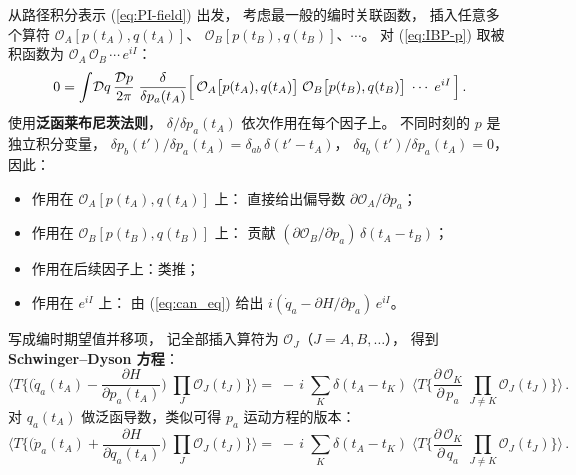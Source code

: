 \medskip\noindent
从路径积分表示 (\ref{eq:PI-field}) 出发，
考虑最一般的编时关联函数，
插入任意多个算符
$\mathcal{O}_A[p(t_A),q(t_A)]$、
$\mathcal{O}_B[p(t_B),q(t_B)]$、$\cdots$。
对 (\ref{eq:IBP-p}) 取被积函数为
$\mathcal{O}_A\,\mathcal{O}_B\,\cdots\,e^{iI}$：
\begin{equation}\label{eq:SD-gen-start}
  0=\int\!\mathcal{D}q\,\frac{\mathcal{D}p}{2\pi}\;
  \frac{\delta}{\delta p_a(t_A)}
  \Bigl[\,
    \mathcal{O}_A\bigl[p(t_A),q(t_A)\bigr]\;
    \mathcal{O}_B\bigl[p(t_B),q(t_B)\bigr]\;\cdots\;
    e^{iI}
  \,\Bigr]\,.
\end{equation}
使用\textbf{泛函莱布尼茨法则}，
$\delta/\delta p_a(t_A)$ 依次作用在每个因子上。
不同时刻的 $p$ 是独立积分变量，
$\delta p_b(t')/\delta p_a(t_A)=\delta_{ab}\,\delta(t'-t_A)$，
$\delta q_b(t')/\delta p_a(t_A)=0$，
因此：
\begin{itemize}
\item 作用在 $\mathcal{O}_A[p(t_A),q(t_A)]$ 上：
  直接给出偏导数 $\partial\mathcal{O}_A/\partial p_a$；
\item 作用在 $\mathcal{O}_B[p(t_B),q(t_B)]$ 上：
  贡献 $(\partial\mathcal{O}_B/\partial p_a)\,\delta(t_A-t_B)$；
\item 作用在后续因子上：类推；
\item 作用在 $e^{iI}$ 上：
  由 (\ref{eq:can_eq}) 给出
  $i(\dot{q}_a-\partial H/\partial p_a)\,e^{iI}$。
\end{itemize}
写成编时期望值并移项，
记全部插入算符为 $\mathcal{O}_J$（$J=A,B,\dots$），
得到\textbf{Schwinger--Dyson 方程}：
\begin{equation}\label{eq:SD-general}
  \biggl\langle T\!\biggl\{
    \biggl(\dot{q}_a(t_A)
      -\frac{\partial H}{\partial p_a(t_A)}\biggr)
    \;\prod_{J}\mathcal{O}_J(t_J)
  \biggr\}\biggr\rangle
  =\;-\,i\;\sum_{K}\delta(t_A-t_K)\;
  \biggl\langle T\!\biggl\{
    \frac{\partial\,\mathcal{O}_K}{\partial\,p_a}\;
    \prod_{J\neq K}\mathcal{O}_J(t_J)
  \biggr\}\biggr\rangle\,.
\end{equation}
对 $q_a(t_A)$ 做泛函导数，类似可得 $p_a$ 运动方程的版本：
\begin{equation}\label{eq:SD-general-q}
  \biggl\langle T\!\biggl\{
    \biggl(\dot{p}_a(t_A)
      +\frac{\partial H}{\partial q_a(t_A)}\biggr)
    \;\prod_{J}\mathcal{O}_J(t_J)
  \biggr\}\biggr\rangle
  =\;-\,i\;\sum_{K}\delta(t_A-t_K)\;
  \biggl\langle T\!\biggl\{
    \frac{\partial\,\mathcal{O}_K}{\partial\,q_a}\;
    \prod_{J\neq K}\mathcal{O}_J(t_J)
  \biggr\}\biggr\rangle\,.
\end{equation}

